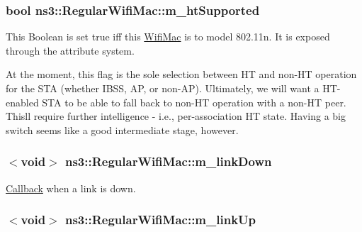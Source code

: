 \subsubsection[{\texorpdfstring{m\+\_\+ht\+Supported}{m_htSupported}}]{\setlength{\rightskip}{0pt plus 5cm}bool ns3\+::\+Regular\+Wifi\+Mac\+::m\+\_\+ht\+Supported\hspace{0.3cm}{\ttfamily [protected]}}\hypertarget{classns3_1_1RegularWifiMac_a8950c44b8cf2ad1f9274821cf88adc7b}{}\label{classns3_1_1RegularWifiMac_a8950c44b8cf2ad1f9274821cf88adc7b}
This Boolean is set {\ttfamily true} iff this \hyperlink{classns3_1_1WifiMac}{Wifi\+Mac} is to model 802.\+11n. It is exposed through the attribute system.

At the moment, this flag is the sole selection between HT and non-\/\+HT operation for the S\+TA (whether I\+B\+SS, AP, or non-\/\+AP). Ultimately, we will want a H\+T-\/enabled S\+TA to be able to fall back to non-\/\+HT operation with a non-\/\+HT peer. This\textquotesingle{}ll require further intelligence -\/ i.\+e., per-\/association HT state. Having a big switch seems like a good intermediate stage, however. 
\subsubsection[{\texorpdfstring{m\+\_\+link\+Down}{m_linkDown}}]{$<$void$>$ ns3\+::\+Regular\+Wifi\+Mac\+::m\+\_\+link\+Down\hspace{0.3cm}{\ttfamily [protected]}}\hypertarget{classns3_1_1RegularWifiMac_a4951247f850b30e1367565ebeb2999e5}{}\label{classns3_1_1RegularWifiMac_a4951247f850b30e1367565ebeb2999e5}


\hyperlink{classns3_1_1Callback}{Callback} when a link is down. 

\subsubsection[{\texorpdfstring{m\+\_\+link\+Up}{m_linkUp}}]{$<$void$>$ ns3\+::\+Regular\+Wifi\+Mac\+::m\+\_\+link\+Up\hspace{0.3cm}{\ttfamily [protected]}}\hypertarget{classns3_1_1RegularWifiMac_aed501c39503c91f613c3e85d444c1729}{}\label{classns3_1_1RegularWifiMac_aed501c39503c91f613c3e85d444c1729}


